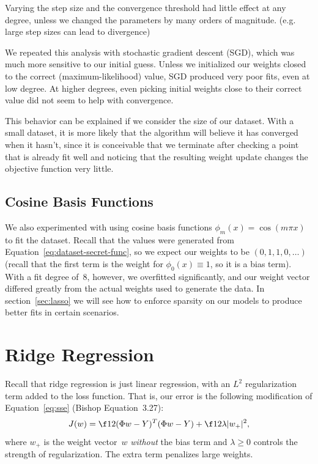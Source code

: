 \documentclass{article}
\begin{document}
\begin{multicols}{2}
Varying the step size and the convergence threshold had little effect at any degree, unless we changed the parameters by many orders of magnitude. (e.g. large step sizes can lead to divergence)

We repeated this analysis with stochastic gradient descent (SGD), which was much more sensitive to our initial guess.
Unless we initialized our weights closed to the correct (maximum-likelihood) value, SGD produced very poor fits, even at low degree.
At higher degrees, even picking initial weights close to their correct value did not seem to help with convergence.

This behavior can be explained if we consider the size of our dataset.
With a small dataset, it is more likely that the algorithm will believe it has converged when it hasn't, since it is conceivable that we terminate after checking a point that is already fit well and noticing that the resulting weight update changes the objective function very little.


\subsection{Cosine Basis Functions}

We also experimented with using cosine basis functions $\phi_m(x) = \cos(m\pi x)$ to fit the dataset.
Recall that the values were generated from Equation~\ref{eq:dataset-secret-func}, so we expect our weights to be $(0, 1, 1, 0, \dots)$ (recall that the first term is the weight for $\phi_0(x) \equiv 1$, so it is a bias term).
With a fit degree of~8, however, we overfitted significantly, and our weight vector differed greatly from the actual weights used to generate the data.
In section~\ref{sec:lasso} we will see how to enforce sparsity on our models to produce better fits in certain scenarios.




\section{Ridge Regression}

Recall that ridge regression is just linear regression, with an $L^2$ regularization term added to the loss function. That is, our error is the following modification of Equation~\ref{eq:sse} (Bishop Equation~3.27):
\begin{equation}\label{eq:moderr}
J(w) = \f12 (\Phi w - Y)^T (\Phi w - Y) + \f12 \lambda |w_+|^2,
\end{equation}
where $w_+$ is the weight vector~$w$ \emph{without} the bias term and $\lambda\ge 0$ controls the strength of regularization. The extra term penalizes large weights.


\end{multicols}
\end{document}
